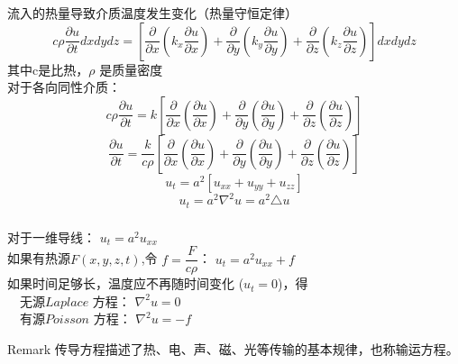 \begin{frame}
	\frametitle{}	
	流入的热量导致介质温度发生变化（热量守恒定律）\\
	\begin{equation*}
		c \rho \frac{\partial u}{\partial t}dxdydz=[\frac{\partial }{\partial x} (k_x\frac{\partial u}{\partial x}) + \frac{\partial }{\partial y} (k_y\frac{\partial u}{\partial y}) + \frac{\partial }{\partial z} (k_z\frac{\partial u}{\partial z}) ]dxdydz 
	\end{equation*}
	其中c是比热，$\rho$ 是质量密度 \\ \vspace{0.3em}
	对于各向同性介质：
	\begin{equation*}
		c \rho \frac{\partial u }{\partial t}=k[\frac{\partial }{\partial x} (\frac{\partial u}{\partial x}) + \frac{\partial }{\partial y} (\frac{\partial u}{\partial y}) + \frac{\partial }{\partial z} (\frac{\partial u}{\partial z}) ]	
	\end{equation*}
	\begin{equation*}
		\frac{\partial u }{\partial t}=\frac{k}{c\rho}[\frac{\partial }{\partial x} (\frac{\partial u}{\partial x}) + \frac{\partial }{\partial y} (\frac{\partial u}{\partial y}) + \frac{\partial }{\partial z} (\frac{\partial u}{\partial z}) ]	
	\end{equation*}
	\begin{equation*}
		u_t=a^2 [u_{xx}   +u_{yy}  +u_{zz}] 
	\end{equation*}
	\begin{equation*}
		u_t=a^2 \nabla ^2 u = a^2 \triangle u	
	\end{equation*}
\end{frame}	

\begin{frame}
	\frametitle{}	
	对于一维导线：
	{ $\displaystyle u_t= a^2 u_{xx}$ }  \\ 
	如果有热源$F(x,y,z,t)$,令 $f=\dfrac{F}{c\rho}$：	{$\displaystyle u_t= a^2 u_{xx}+f$ }  \\
	如果时间足够长，温度应不再随时间变化 ($u_t =0$)，得 \\ 
	{\Bullet}~~无源$Laplace$ 方程： { $\displaystyle   \nabla ^2 u =0$ }  \\ 
	{\Bullet}~~有源$Poisson$ 方程： { $\displaystyle   \nabla ^2 u =-f$ }  \\  \vspace{1em}
	\begin{block}{Remark}
		传导方程描述了热、电、声、磁、光等传输的基本规律，也称输运方程。
	\end{block}
\end{frame}	


